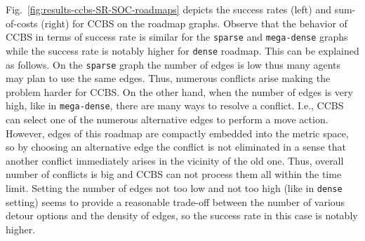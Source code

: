 \documentclass[review]{elsarticle}
\newcommand\konstantin[1]{\nb{\textbf{Konstantin:}}{red}{#1}}
\newcommand\roni[1]{\nb{\textbf{Roni:}}{green}{#1}}
\newcommand{\ccbs}{\ac{CCBS}\xspace}
\begin{document}
Fig.~\ref{fig:results-ccbs-SR-SOC-roadmaps} depicts the success rates (left) and sum-of-costs (right) for \ccbs on the roadmap graphs. 
Observe that the behavior of \ccbs in terms of success rate is similar for the \texttt{sparse} and \texttt{mega-dense} graphs while the success rate is notably higher for \texttt{dense} roadmap. This can be explained as follows. On the \texttt{sparse} graph the number of edges is low thus many agents may plan to use the same edges. Thus, numerous conflicts arise making the problem harder for \ccbs. On the other hand, when the number of edges is very high, like in \texttt{mega-dense}, there are many ways to resolve a conflict. I.e., \ccbs can select one of the numerous alternative edges to perform a move action. However, edges of this roadmap are compactly embedded into the metric space, so by choosing an alternative edge the conflict is not eliminated in a sense that another conflict immediately arises in the vicinity of the old one. Thus, overall number of conflicts is big and \ccbs can not process them all within the time limit. Setting the number of edges not too low and not too high (like in \texttt{dense} setting) seems to provide a reasonable trade-off between the number of various detour options and the density of edges, so the success rate in this case is notably higher.
\end{document}
